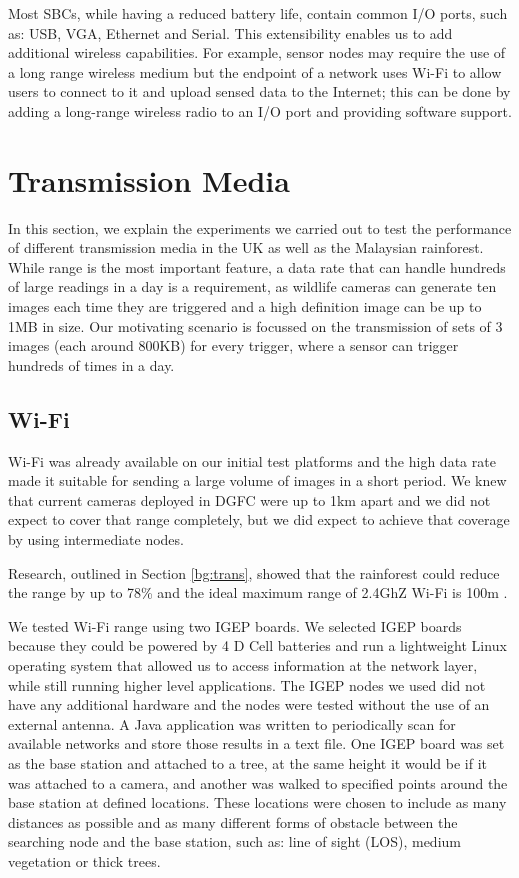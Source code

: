 Most SBCs, while having a reduced battery life, contain common I/O ports, such as: USB, VGA, Ethernet and Serial. This extensibility enables us to add additional wireless capabilities. For example, sensor nodes may require the use of a long range wireless medium but the endpoint of a network uses Wi-Fi to allow users to connect to it and upload sensed data to the Internet; this can be done by adding a long-range wireless radio to an I/O port and providing software support.

\section{Transmission Media}\label{tech:wireless}
	In this section, we explain the experiments we carried out to test the performance of different transmission media in the UK as well as the Malaysian rainforest. While range is the most important feature, a data rate that can handle hundreds of large readings in a day is a requirement, as wildlife cameras can generate ten images each time they are triggered and a high definition image can be up to 1MB in size. Our motivating scenario is focussed on the transmission of sets of 3 images (each around 800KB) for every trigger, where a sensor can trigger hundreds of times in a day.

\subsection{Wi-Fi}\label{tech:wifi}
Wi-Fi was already available on our initial test platforms and the high data rate made it suitable for sending a large volume of images in a short period. We knew that current cameras deployed in DGFC were up to 1km apart and we did not expect to cover that range completely, but we did expect to achieve that coverage by using intermediate nodes.

Research, outlined in Section \ref{bg:trans}, showed that the rainforest could reduce the range by up to 78\% and the ideal maximum range of 2.4GhZ Wi-Fi is 100m \cite{Dhawan2007}. 

We tested Wi-Fi range using two IGEP boards. We selected IGEP boards because they could be powered by 4 D Cell batteries and run a lightweight Linux operating system that allowed us to access information at the network layer, while still running higher level applications. The IGEP nodes we used did not have any additional hardware and the nodes were tested without the use of an external antenna. A Java application was written to periodically scan for available networks and store those results in a text file. One IGEP board was set as the base station and attached to a tree, at the same height it would be if it was attached to a camera, and another was walked to specified points around the base station at defined locations. These locations were chosen to include as many distances as possible and as many different forms of obstacle between the searching node and the base station, such as: line of sight (LOS), medium vegetation or thick trees.
			
